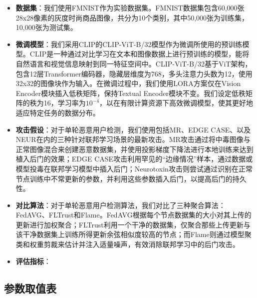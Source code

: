 \documentclass[lettersize,journal]{IEEEtran}
\begin{document}
\begin{itemize}
    \item \textbf{数据集}：我们使用FMNIST\cite{minist}作为实验数据集。FMNIST数据集包含60,000张28x28像素的灰度时尚商品图像，共分为10个类别，其中50,000张为训练集，10,000张为测试集。
    
    \item \textbf{微调模型}：我们采用CLIP的CLIP-ViT-B/32\cite{huggingface_clip}模型作为微调所使用的预训练模型。CLIP是一种通过对比学习在文本和图像数据上进行预训练的模型，能将自然语言和视觉信息映射到同一特征空间中。CLIP-ViT-B/32基于ViT\cite{vit}架构，包含12层Transformer编码器，隐藏层维度为768，多头注意力头数为12，使用32x32的图像块作为输入。在微调过程中，我们使用LORA\cite{lora}方案仅在Vision Encoder模块插入低秩矩阵，保持Textual Encoder模块不变。我们设定低秩矩阵的秩为16，学习率为$10^{-4}$，以在有限计算资源下高效微调模型，使其更好地适应特定任务的数据分布。

    \item \textbf{攻击假设}：对于单轮恶意用户检测，我们使用包括MR\cite{MR}、EDGE CASE\cite{EDGE_CASE}、以及NEUR\cite{zhang2022neurotoxin}在内的三种针对联邦学习场景的最新攻击。MR攻击通过将中毒图像与正常图像混合来创建恶意数据集，并使用投影梯度下降法进行本地训练来达到植入后门的效果；EDGE CASE攻击利用罕见的“边缘情况”样本，通过数据或模型投毒在联邦学习模型中插入后门；Neurotoxin攻击则尝试通过识别在正常节点训练中不常更新的参数，并利用这些参数插入后门，以提高后门的持久性。

    \item \textbf{对比算法}：对于单轮恶意用户检测算法，我们对比了三种聚合算法：FedAVG\cite{FedAVG}、FLTrust\cite{FLTrust}和Flame\cite{FLAME}。FedAVG根据每个节点数据集的大小对其上传的更新进行加权聚合；FLTrust利用一个干净的数据集，仅聚合那些上传更新与该干净数据集上训练所得更新余弦相似度较高的节点；而Flame则通过模型聚类和权重剪裁来估计并注入适量噪声，有效消除联邦学习中的后门攻击。
    
    \item \textbf{评估指标}：
    
\end{itemize}


\subsection{参数取值表}


\end{document}
